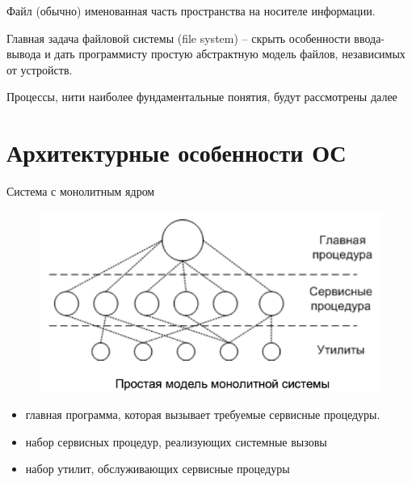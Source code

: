 \documentclass{beamer}
\begin{document}
\begin{frame}[t]
\begin{block}{Файл}
(обычно) именованная часть пространства на носителе информации.
\end{block}
Главная задача файловой системы (file system) – скрыть особенности ввода-вывода и дать программисту простую абстрактную модель файлов, независимых от устройств. 
\begin{block}{Процессы, нити}
наиболее фундаментальные понятия, будут рассмотрены далее
\end{block}
\end{frame}

\section{Архитектурные особенности ОС}

\begin{frame}[t]
Система с монолитным ядром
\begin{figure}[h]
\centering
\includegraphics[scale=0.5]{images/lec01-pic02.png}
\end{figure}
\begin{itemize}
\item главная программа, которая вызывает требуемые сервисные процедуры.
\item набор сервисных процедур, реализующих системные вызовы
\item набор утилит, обслуживающих сервисные процедуры
\end{itemize}
\end{frame}
\end{document}
